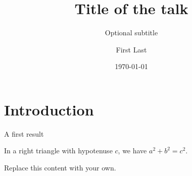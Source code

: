 \documentclass{BeamerJS}
\title{Title of the talk}
\subtitle{Optional subtitle}
\author{First Last}
\date{\today}
\begin{document}
\begin{frame}
	\titlepage
\end{frame}

\section{Introduction}

\begin{frame}{A first result}
	\begin{thm}[Pythagoras]
		In a right triangle with hypotenuse $c$, we have $a^2+b^2=c^2$.
	\end{thm}

	\begin{keypoint}
		Replace this content with your own.
	\end{keypoint}
\end{frame}
\end{document}
